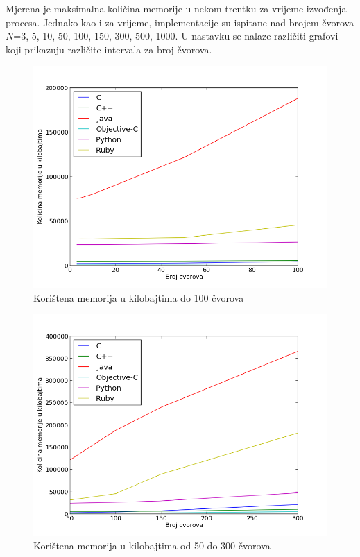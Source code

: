 \documentclass[times, utf8, seminar, numeric]{fer}
\begin{document}
Mjerena je maksimalna količina memorije u nekom trentku za vrijeme izvođenja procesa. Jednako kao i za vrijeme, implementacije su ispitane nad brojem čvorova $N$=3, 5, 10, 50, 100, 150, 300, 500, 1000. U nastavku se nalaze različiti grafovi koji prikazuju različite intervala za broj čvorova. 

\begin{figure}[!h]
\centering
\includegraphics[scale=0.6]{./img/memorija_100.png}
\caption{Korištena memorija u kilobajtima do 100 čvorova}
\label{fig:memorija_100}
\end{figure}

\begin{figure}[!h]
\centering
\includegraphics[scale=0.6]{./img/memorija_300.png}
\caption{Korištena memorija u kilobajtima od 50 do 300 čvorova}
\label{fig:memorija_300}
\end{figure}
\end{document}
